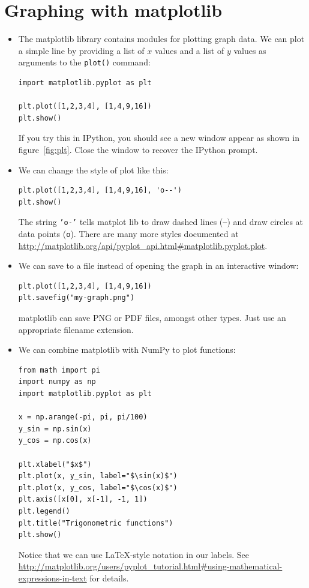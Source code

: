 \documentclass[a4paper,twoside,titlepage]{memoir}
\newcommand{\shellcmd}{\texttt}
\begin{document}
\chapter{Graphing with matplotlib}
\begin{itemize}
\item The matplotlib library contains modules for plotting graph data.  We can plot a simple line by providing a list of $x$ values and a list of $y$ values as arguments to the \shellcmd{plot()} command:
\index{plot@\shellcmd{plot()}}
\begin{verbatim}
import matplotlib.pyplot as plt

plt.plot([1,2,3,4], [1,4,9,16])
plt.show()
\end{verbatim}
If you try this in IPython, you should see a new window appear as shown in figure~\ref{fig:plt}.  Close the window to recover the IPython prompt.
\item We can change the style of plot like this:
\begin{verbatim}
plt.plot([1,2,3,4], [1,4,9,16], 'o--')
plt.show()
\end{verbatim}
The string \shellcmd{'o-'} tells matplot lib to draw dashed lines (\shellcmd{--}) and draw circles at data points (\shellcmd{o}).  There are many more styles documented at \url{http://matplotlib.org/api/pyplot_api.html#matplotlib.pyplot.plot}.

\item We can save to a file instead of opening the graph in an interactive window:
\begin{verbatim}
plt.plot([1,2,3,4], [1,4,9,16])
plt.savefig("my-graph.png")
\end{verbatim}
matplotlib can save PNG or PDF files, amongst other types.  Just use an appropriate filename extension.

\item We can combine matplotlib with NumPy to plot functions:
\begin{verbatim}
from math import pi
import numpy as np
import matplotlib.pyplot as plt

x = np.arange(-pi, pi, pi/100)
y_sin = np.sin(x)
y_cos = np.cos(x)

plt.xlabel("$x$")
plt.plot(x, y_sin, label="$\sin(x)$")
plt.plot(x, y_cos, label="$\cos(x)$")
plt.axis([x[0], x[-1], -1, 1])
plt.legend()
plt.title("Trigonometric functions")
plt.show()
\end{verbatim}
Notice that we can use \LaTeX-style notation in our labels.  See \url{http://matplotlib.org/users/pyplot_tutorial.html#using-mathematical-expressions-in-text} for details.
\end{itemize}
\end{document}
